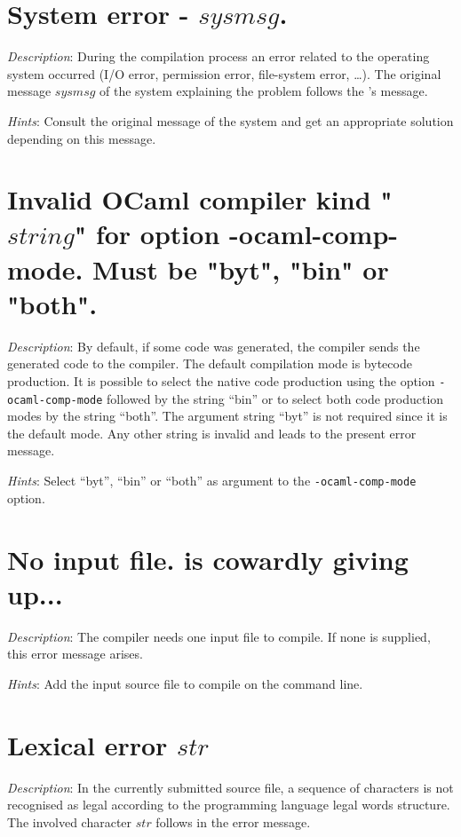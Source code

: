 \section*{System error - $sysmsg$.}
{\em Description}: During the compilation process an error related to
the operating system occurred (I/O error, permission error, file-system
error, \ldots). The original message $sysmsg$ of the system explaining
the problem follows the {\focal}'s message.

{\em Hints}: Consult the original message of the system and get an
appropriate solution depending on this message.



\section*{Invalid OCaml compiler kind "$string$" for option -ocaml-comp-mode. Must be "byt", "bin" or "both".}
{\em Description}: By default, if some {\ocaml} code was generated, the
{\focal} compiler sends the generated code to the {\ocaml} compiler. The
default compilation mode is bytecode production. It is possible to
select the native code production using the option {\tt -ocaml-comp-mode}
followed by the string ``bin'' or to select both code production modes
by the string ``both''. The argument string ``byt'' is not required
since it is the default mode. Any other string is invalid and leads to
the present error message.

{\em Hints}: Select ``byt'', ``bin'' or ``both'' as argument to the
{\tt -ocaml-comp-mode} option.



\section*{No input file. {\focalizec} is cowardly giving up...}
{\em Description}: The {\focal} compiler needs one input file to
compile. If none is supplied, this error message arises.

{\em Hints}: Add the input source file to compile on the command
line.



\section*{Lexical error $str$}
{\em Description}: In the currently submitted source file, a sequence
of characters is not recognised as legal according to the
{\focal} programming language legal words structure. The involved
character $str$ follows in the error message.

